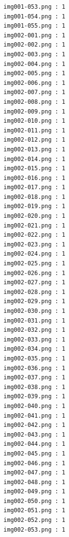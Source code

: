 \documentclass[12pt,a4paper]{article}
\begin{document}
\begin{lstlisting}
                     img001-053.png : 1
                     img001-054.png : 1
                     img001-055.png : 1
                     img002-001.png : 1
                     img002-002.png : 1
                     img002-003.png : 1
                     img002-004.png : 1
                     img002-005.png : 1
                     img002-006.png : 1
                     img002-007.png : 1
                     img002-008.png : 1
                     img002-009.png : 1
                     img002-010.png : 1
                     img002-011.png : 1
                     img002-012.png : 1
                     img002-013.png : 1
                     img002-014.png : 1
                     img002-015.png : 1
                     img002-016.png : 1
                     img002-017.png : 1
                     img002-018.png : 1
                     img002-019.png : 1
                     img002-020.png : 1
                     img002-021.png : 1
                     img002-022.png : 1
                     img002-023.png : 1
                     img002-024.png : 1
                     img002-025.png : 1
                     img002-026.png : 1
                     img002-027.png : 1
                     img002-028.png : 1
                     img002-029.png : 1
                     img002-030.png : 1
                     img002-031.png : 1
                     img002-032.png : 1
                     img002-033.png : 1
                     img002-034.png : 1
                     img002-035.png : 1
                     img002-036.png : 1
                     img002-037.png : 1
                     img002-038.png : 1
                     img002-039.png : 1
                     img002-040.png : 1
                     img002-041.png : 1
                     img002-042.png : 1
                     img002-043.png : 1
                     img002-044.png : 1
                     img002-045.png : 1
                     img002-046.png : 1
                     img002-047.png : 1
                     img002-048.png : 1
                     img002-049.png : 1
                     img002-050.png : 1
                     img002-051.png : 1
                     img002-052.png : 1
                     img002-053.png : 1




\end{lstlisting}
\end{document}
